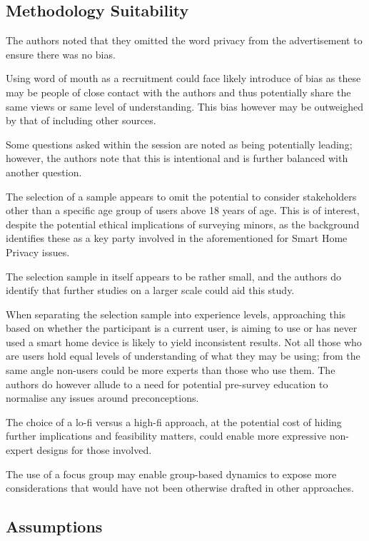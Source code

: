 \subsection{Methodology Suitability}

The authors noted that they omitted the word privacy from the advertisement to ensure there was no bias.

Using word of mouth as a recruitment could face likely introduce of bias as these may be people of close contact with the authors and thus potentially share the same views or same level of understanding. This bias however may be outweighed by that of including other sources.

Some questions asked within the session are noted as being potentially leading; however, the authors note that this is intentional and is further balanced with another question.

The selection of a sample appears to omit the potential to consider stakeholders other than a specific age group of users above 18 years of age. This is of interest, despite the potential ethical implications of surveying minors, as the background identifies these as a key party involved in the aforementioned for Smart Home Privacy issues.

The selection sample in itself appears to be rather small, and the authors do identify that further studies on a larger scale could aid this study.

When separating the selection sample into experience levels, approaching this based on whether the participant is a current user, is aiming to use or has never used a smart home device is likely to yield inconsistent results. Not all those who are users hold equal levels of understanding of what they may be using; from the same angle non-users could be more experts than those who use them. The authors do however allude to a need for potential pre-survey education to normalise any issues around preconceptions.

The choice of a lo-fi versus a high-fi approach, at the potential cost of hiding further implications and feasibility matters, could enable more expressive non-expert designs for those involved.

The use of a focus group may enable group-based dynamics to expose more considerations that would have not been otherwise drafted in other approaches.

\subsection{Assumptions}

